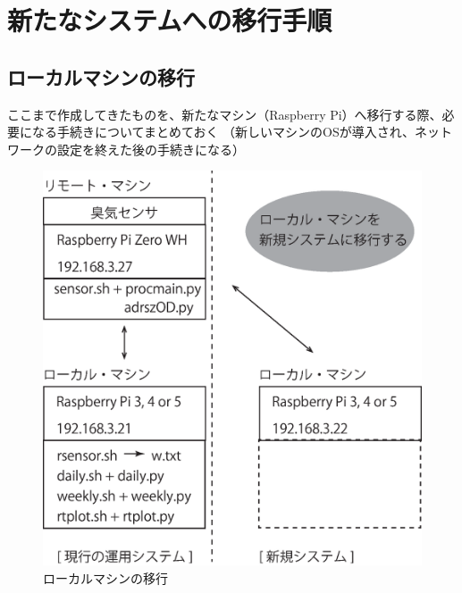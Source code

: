 \documentclass[12pt,a4paper,uplatex]{jsarticle}
\begin{document}






\newpage

\section{新たなシステムへの移行手順}

\subsection{ローカルマシンの移行}

ここまで作成してきたものを、新たなマシン（Raspberry Pi）へ移行する際、必要になる手続きについてまとめておく
（新しいマシンのOSが導入され、ネットワークの設定を終えた後の手続きになる）

\begin{figure}[htbp]
	\begin{minipage}[b]{1.0\linewidth}
		\centering
		\includegraphics[keepaspectratio, scale=0.4]{figs/eps/ikou.eps}
		\caption{ローカルマシンの移行}
	\end{minipage}
\end{figure}
\end{document}
